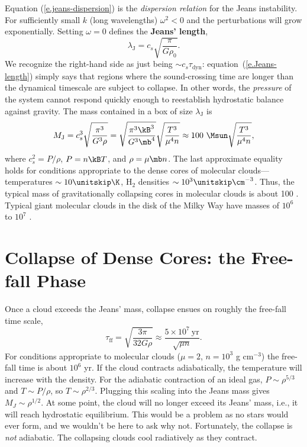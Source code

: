 Equation (\ref{e.jeans-dispersion}) is the {\it dispersion relation} for the Jeans instability.
For sufficiently small $k$ (long wavelengths) $\omega^{2}<0$ and the perturbations will grow exponentially. Setting $\omega = 0$ defines the \textbf{Jeans' length},
\begin{equation}\label{e.Jeans-length}
\lambda_{\mathrm{J}} = c_{s}\sqrt{\frac{\pi}{G\rho_{0}}}.
\end{equation}
We recognize the right-hand side as just being $\sim c_{s} \tau_{\mathrm{dyn}}$: equation~(\ref{e.Jeans-length}) simply says that regions where the sound-crossing time are longer than the dynamical timescale are subject to collapse.
In other words, the {\it pressure} of the system cannot respond quickly enough to reestablish hydrostatic balance against gravity.
The mass contained in a box of size $\lambda_{\mathrm{J}}$ is
\begin{equation}
  M_{\mathrm{J}} = c_{s}^{3} \sqrt{\frac{\pi^3}{G^3\rho}}
  = \sqrt{\frac{\pi^3 \kB^3 }{G^3 \mb^4}} \sqrt{\frac{T^3}{\mu^4 n}}
  \approx 100\ \Msun  \sqrt{\frac{T^3}{\mu^4 n}},\label{e.jeans-mass}
\end{equation}
where $c_s^2=P/\rho$, $P=n\kB T$, and $\rho=\mu \mb n$.
The last approximate equality holds for conditions appropriate to the dense cores of molecular clouds---temperatures $\sim 10\nsp\K$, $\mathrm{H}_{2}$ densities $\sim 10^{3}\nsp\cm^{-3}$.
Thus, the typical mass of gravitationally collapsing cores in molecular clouds is about 100 \Msun. Typical giant molecular clouds in the disk of the Milky Way have masses of $10^6$ to $10^7$ \Msun.

\section{Collapse of Dense Cores: the Free-fall Phase}

Once a cloud exceeds the Jeans' mass, collapse ensues on roughly the free-fall time scale,
\[\tau_\mathrm{ff} = \sqrt{\frac{3\pi}{32 G\rho}} \approx \frac{5\times10^7\ \mathrm{yr}}{\sqrt{\mu n}}.\]
For conditions appropriate to molecular clouds ($\mu=2$, $n=10^3$ g cm$^{-3}$) the free-fall time is about $10^6$ yr.
If the cloud contracts adiabatically, the temperature will increase with the density. For the adiabatic contraction of an ideal gas, $P\sim\rho^{5/3}$ and $T\sim P/\rho$, so $T\sim \rho^{2/3}$.
Plugging this scaling into the Jeans mass gives $M_J \sim \rho^{1/2}$.
At some point, the cloud will no longer exceed its Jeans' mass, i.e., it will reach hydrostatic equilibrium.
This would be a problem as no stars would ever form, and we wouldn't be here to ask why not.
Fortunately, the collapse is {\it not} adiabatic.
The collapsing clouds cool radiatively as they contract.

